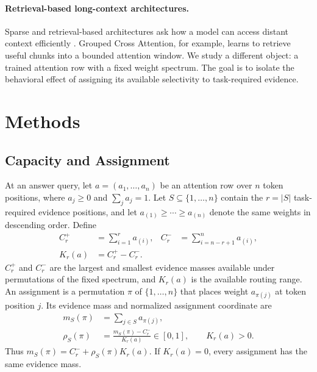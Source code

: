 \documentclass[letterpaper]{article} %
\begin{document}
\paragraph{Retrieval-based long-context architectures.}
Sparse and retrieval-based architectures ask how a model can access distant context efficiently
\citep{sparselong,hu2025causalretrieval}. Grouped Cross Attention, for example, learns to retrieve useful
chunks into a bounded attention window. We study a different object: a trained attention row with a fixed
weight spectrum. The goal is to isolate the behavioral effect of assigning its available selectivity to
task-required evidence.

\section{Methods}

\subsection{Capacity and Assignment}

At an answer query, let $a=(a_1,\ldots,a_n)$ be an attention row over $n$ token positions, where $a_j\ge0$
and $\sum_j a_j=1$. Let $S\subseteq\{1,\ldots,n\}$ contain the $r=|S|$ task-required evidence positions,
and let $a_{(1)}\ge\cdots\ge a_{(n)}$ denote the same weights in descending order. Define
\begin{equation}
\begin{aligned}
 C_r^+&=\sum_{i=1}^{r}a_{(i)}, &
 C_r^-&=\sum_{i=n-r+1}^{n}a_{(i)},\\
 K_r(a)&=C_r^+-C_r^-.
\end{aligned}
\label{eq:capacity}
\end{equation}
$C_r^+$ and $C_r^-$ are the largest and smallest evidence masses available under permutations of the fixed
spectrum, and $K_r(a)$ is the available routing range. An assignment is a permutation $\pi$ of
$\{1,\ldots,n\}$ that places weight $a_{\pi(j)}$ at token position $j$. Its evidence mass and normalized
assignment coordinate are
\begin{equation}
\begin{aligned}
 m_S(\pi)&=\sum_{j\in S}a_{\pi(j)},\\
 \rho_S(\pi)&=\frac{m_S(\pi)-C_r^-}{K_r(a)}\in[0,1],\qquad K_r(a)>0.
\end{aligned}
\label{eq:assignment-coordinate}
\end{equation}
Thus $m_S(\pi)=C_r^-+\rho_S(\pi)K_r(a)$. If $K_r(a)=0$, every assignment has the same evidence mass.
\end{document}
